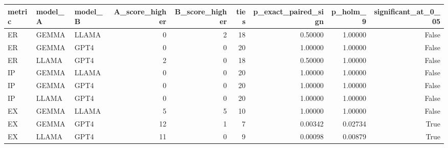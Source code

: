 \begin{tabular}{lllrrrrrr}
\toprule
metric & model\_A & model\_B & A\_score\_higher & B\_score\_higher & ties & p\_exact\_paired\_sign & p\_holm\_9 & significant\_at\_0\_05 \\
\midrule
ER & GEMMA & LLAMA & 0 & 2 & 18 & 0.50000 & 1.00000 & False \\
ER & GEMMA & GPT4 & 0 & 0 & 20 & 1.00000 & 1.00000 & False \\
ER & LLAMA & GPT4 & 2 & 0 & 18 & 0.50000 & 1.00000 & False \\
IP & GEMMA & LLAMA & 0 & 0 & 20 & 1.00000 & 1.00000 & False \\
IP & GEMMA & GPT4 & 0 & 0 & 20 & 1.00000 & 1.00000 & False \\
IP & LLAMA & GPT4 & 0 & 0 & 20 & 1.00000 & 1.00000 & False \\
EX & GEMMA & LLAMA & 5 & 5 & 10 & 1.00000 & 1.00000 & False \\
EX & GEMMA & GPT4 & 12 & 1 & 7 & 0.00342 & 0.02734 & True \\
EX & LLAMA & GPT4 & 11 & 0 & 9 & 0.00098 & 0.00879 & True \\
\bottomrule
\end{tabular}
